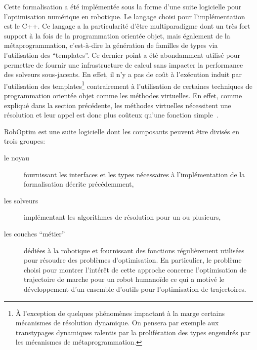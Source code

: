 Cette formalisation a été implémentée sous la forme d'une suite
logicielle pour l'optimisation numérique en robotique. Le langage
choisi pour l'implémentation est le C++. Ce langage a la particularité
d'être multiparadigme dont un très fort support à la fois de la
programmation orientée objet, mais également de la
métaprogrammation, c'est-à-dire la génération
de familles de types via l'utilisation des ``templates''. Ce dernier
point a été abondamment utilisé pour permettre de fournir une
infrastructure de calcul sans impacter la performance des solveurs
sous-jacents. En effet, il n'y a pas de coût à l'exécution induit par
l'utilisation des templates\footnote{À l'exception de quelques
  phénomènes impactant à la marge certains mécanismes de résolution
  dynamique. On pensera par exemple aux transtypages dynamiques
  ralentis par la prolifération des types engendrés par les mécanismes
  de métaprogrammation.} contrairement à l'utilisation de certaines
techniques de programmation orientée objet comme les méthodes
virtuelles. En effet, comme expliqué dans la section précédente, les
méthodes virtuelles nécessitent une résolution et leur appel est donc
plus coûteux qu'une fonction simple \citep{96driesen}.


RobOptim est une suite logicielle dont les composants
peuvent être divisés en trois groupes:
\begin{description}
\item[le noyau] fournissant les interfaces et les types nécessaires à
  l'implémentation de la formalisation décrite précédemment,
\item[les solveurs] implémentant les algorithmes de résolution pour un ou plusieurs,
\item[les couches ``métier''] dédiées à la
  robotique et fournissant des fonctions régulièrement utilisées pour
  résoudre des problèmes d'optimisation. En particulier, le problème
  choisi pour montrer l'intérêt de cette approche concerne
  l'optimisation de trajectoire de marche pour un robot humanoïde ce
  qui a motivé le développement d'un ensemble d'outils pour
  l'optimisation de trajectoires.
\end{description}

